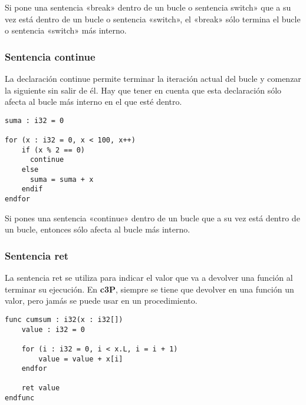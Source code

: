 Si pone una sentencia «break» dentro de un bucle o sentencia switch» que a su vez está dentro de un bucle o sentencia «switch»,
el «break» sólo termina el bucle o sentencia «switch» más interno. 

\subsubsection{Sentencia continue}

La declaración continue permite terminar la iteración actual del bucle y
comenzar la siguiente sin salir de él. Hay que tener en cuenta que esta
declaración sólo afecta al bucle más interno en el que esté dentro.

\begin{verbatim}
suma : i32 = 0

for (x : i32 = 0, x < 100, x++)
    if (x % 2 == 0)
      continue
    else
      suma = suma + x
    endif
endfor
\end{verbatim}

Si pones una sentencia «continue» dentro de un bucle que a su vez está dentro de un bucle, entonces sólo afecta al bucle más interno. 

\subsubsection{Sentencia ret}

La sentencia ret se utiliza para indicar el valor que va a devolver una función al
terminar su ejecución. En \textbf{c3P}, siempre se tiene que devolver en una
función un valor, pero jamás se puede usar en un procedimiento.

\begin{verbatim}
func cumsum : i32(x : i32[])
    value : i32 = 0
    
    for (i : i32 = 0, i < x.L, i = i + 1)
        value = value + x[i]
    endfor
    
    ret value
endfunc
\end{verbatim}